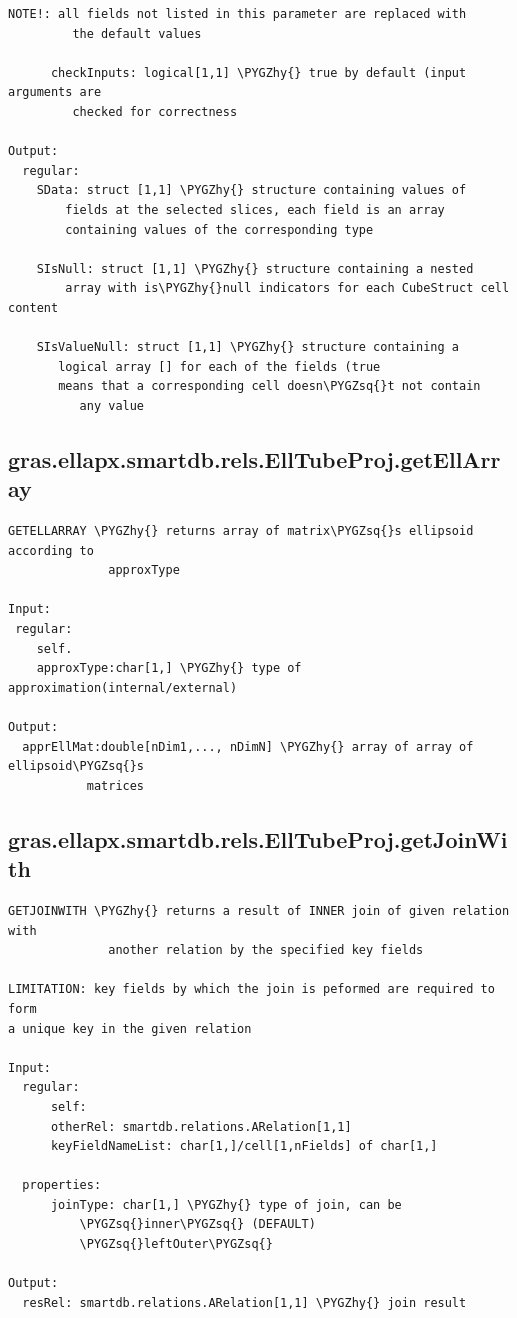\documentclass[letterpaper,10pt,english]{sphinxmanual}
\def\PYGZhy{\char`\-}
\def\PYGZsq{\char`\'}
\begin{document}
\begin{Verbatim}[commandchars=\\\{\}]
         NOTE!: all fields not listed in this parameter are replaced with
         the default values

      checkInputs: logical[1,1] \PYGZhy{} true by default (input arguments are
         checked for correctness

Output:
  regular:
    SData: struct [1,1] \PYGZhy{} structure containing values of
        fields at the selected slices, each field is an array
        containing values of the corresponding type

    SIsNull: struct [1,1] \PYGZhy{} structure containing a nested
        array with is\PYGZhy{}null indicators for each CubeStruct cell content

    SIsValueNull: struct [1,1] \PYGZhy{} structure containing a
       logical array [] for each of the fields (true
       means that a corresponding cell doesn\PYGZsq{}t not contain
          any value
\end{Verbatim}


\subsection{gras.ellapx.smartdb.rels.EllTubeProj.getEllArray}
\label{chap_functions:gras-ellapx-smartdb-rels-elltubeproj-getellarray}
\begin{Verbatim}[commandchars=\\\{\}]
GETELLARRAY \PYGZhy{} returns array of matrix\PYGZsq{}s ellipsoid according to
              approxType

Input:
 regular:
    self.
    approxType:char[1,] \PYGZhy{} type of approximation(internal/external)

Output:
  apprEllMat:double[nDim1,..., nDimN] \PYGZhy{} array of array of ellipsoid\PYGZsq{}s
           matrices
\end{Verbatim}


\subsection{gras.ellapx.smartdb.rels.EllTubeProj.getJoinWith}
\label{chap_functions:gras-ellapx-smartdb-rels-elltubeproj-getjoinwith}
\begin{Verbatim}[commandchars=\\\{\}]
GETJOINWITH \PYGZhy{} returns a result of INNER join of given relation with
              another relation by the specified key fields

LIMITATION: key fields by which the join is peformed are required to form
a unique key in the given relation

Input:
  regular:
      self:
      otherRel: smartdb.relations.ARelation[1,1]
      keyFieldNameList: char[1,]/cell[1,nFields] of char[1,]

  properties:
      joinType: char[1,] \PYGZhy{} type of join, can be
          \PYGZsq{}inner\PYGZsq{} (DEFAULT)
          \PYGZsq{}leftOuter\PYGZsq{}

Output:
  resRel: smartdb.relations.ARelation[1,1] \PYGZhy{} join result
\end{Verbatim}
\end{document}
